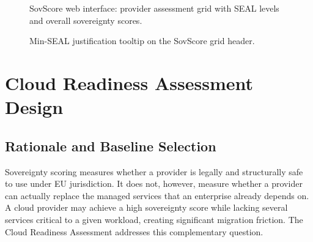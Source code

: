 \begin{figure}[htbp]
  \centering
  \caption{SovScore web interface: provider assessment grid with SEAL levels and overall sovereignty scores.}
  \label{fig:sovscore_ui}
\end{figure}

\begin{figure}[htbp]
  \centering
  \caption{Min-SEAL justification tooltip on the SovScore grid header.}
  \label{fig:sovscore_tooltip}
\end{figure}


\section{Cloud Readiness Assessment Design}
\label{sec:readiness_methodology}

\subsection{Rationale and Baseline Selection}
\label{subsec:readiness_rationale}

Sovereignty scoring measures whether a provider is legally and structurally safe to use under EU jurisdiction. It does not, however, measure whether a provider can actually replace the managed services that an enterprise already depends on. A cloud provider may achieve a high sovereignty score while lacking several services critical to a given workload, creating significant migration friction. The Cloud Readiness Assessment addresses this complementary question.

